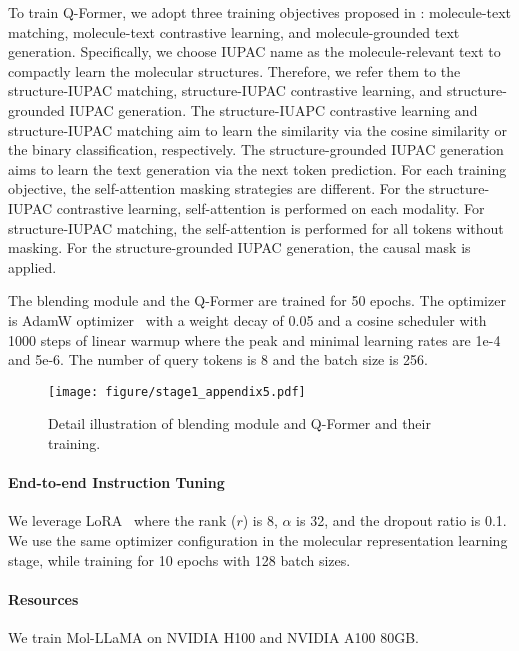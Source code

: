 To train Q-Former, we adopt three training objectives proposed in \citet{li2024molm}: molecule-text matching, molecule-text contrastive learning, and molecule-grounded text generation. Specifically, we choose IUPAC name as the molecule-relevant text to compactly learn the molecular structures. Therefore, we refer them to the structure-IUPAC matching, structure-IUPAC contrastive learning, and structure-grounded IUPAC generation. The structure-IUAPC contrastive learning and structure-IUPAC matching aim to learn the similarity via the cosine similarity or the binary classification, respectively. The structure-grounded IUPAC generation aims to learn the text generation via the next token prediction.
For each training objective, the self-attention masking strategies are different. For the structure-IUPAC contrastive learning, self-attention is performed on each modality. For structure-IUPAC matching, the self-attention is performed for all tokens without masking. For the structure-grounded IUPAC generation, the causal mask is applied.

The blending module and the Q-Former are trained for 50 epochs. The optimizer is AdamW optimizer~\cite{loshchilov2017adamw} with a weight decay of 0.05 and a cosine scheduler with 1000 steps of linear warmup where the peak and minimal learning rates are 1e-4 and 5e-6. The number of query tokens is 8 and the batch size is 256. 

\begin{figure*}[h!]
    \centering
    \vspace{-0.12in}
    \texttt{[image: figure/stage1\_appendix5.pdf]}
    \vspace{-0.13in}
    \caption{Detail illustration of blending module and Q-Former and their training.}
    \label{app:fig:stage1_overall}
    \vspace{-0.1in}
\end{figure*}

\vspace{-0.07in}
\paragraph{End-to-end Instruction Tuning}
We leverage LoRA~\cite{hu2021lora} where the rank ($r$) is 8, $\alpha$ is 32, and the dropout ratio is 0.1. We use the same optimizer configuration in the molecular representation learning stage, while training for 10 epochs with 128 batch sizes.

\vspace{-0.07in}
\paragraph{Resources} We train Mol-LLaMA on NVIDIA H100 and NVIDIA A100 80GB.

